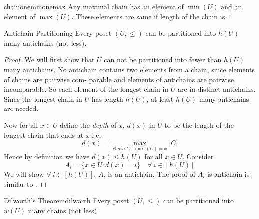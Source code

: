 \begin{lemma}{}{chainoneminonemax}
	Any maximal chain has an element of $\min(U)$ and an element of $\max(U)$. These elements are same if length of the chain is $1$
\end{lemma}
\begin{Theorem}{Antichain Partitioning}{}
	Every poset $(U,\leq )$ can be partitioned into $h(U)$ many antichains (not less). 
\end{Theorem}
\begin{proof}
	We will first show that $U$ can not be partitioned into fewer than $h(U)$ many antichains. No antichain contains two elements from a chain,  since elements of chains are pairwise com-
	parable and elements of antichains are pairwise incomparable. So each element of the longest chain in $U$ are in distinct antichains. Since the longest chain in $U$ has length $h(U)$, at least $h(U)$ many antichains are needed.
	
	Now for all $x\in U$ define the \textit{depth} of $x$, $d(x)$ in $U$ to be the length of the longest chain that ends at $x$ i.e. $$d(x)=\max\limits_{\textit{chain $C$},\; \max(C)=x}|C|$$Hence by definition we have $d(x)\leq h(U)$ for all $x\in U$. Consider $$A_i=\{x\in U\colon d(x)=i\}\quad\forall\ i\in[h(U)]$$We will show $\forall\ i\in[h(U)]$, $A_i$ is an antichain. The proof of $A_i$ is antichain is similar to .
\end{proof}
\begin{Theorem}{Dilworth's Theorem}{dilworth}
	Every poset $(U,\leq)$ can be partitioned into $w(U)$ many chains (not less).
\end{Theorem}
